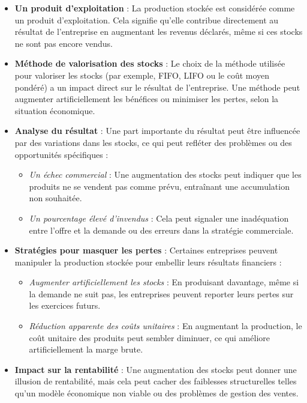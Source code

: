 \documentclass[a4paper, 12pt]{report}
\begin{document}
\begin{itemize}
	\item \textbf{Un produit d'exploitation} : La production stockée est considérée comme un produit d'exploitation. Cela signifie qu'elle contribue directement au résultat de l'entreprise en augmentant les revenus déclarés, même si ces stocks ne sont pas encore vendus.
	\item \textbf{Méthode de valorisation des stocks} : Le choix de la méthode utilisée pour valoriser les stocks (par exemple, FIFO, LIFO ou le coût moyen pondéré) a un impact direct sur le résultat de l'entreprise. Une méthode peut augmenter artificiellement les bénéfices ou minimiser les pertes, selon la situation économique.
	\item \textbf{Analyse du résultat} : Une part importante du résultat peut être influencée par des variations dans les stocks, ce qui peut refléter des problèmes ou des opportunités spécifiques :
	\begin{itemize}
		\item \textit{Un échec commercial} : Une augmentation des stocks peut indiquer que les produits ne se vendent pas comme prévu, entraînant une accumulation non souhaitée.
		\item \textit{Un pourcentage élevé d'invendus} : Cela peut signaler une inadéquation entre l'offre et la demande ou des erreurs dans la stratégie commerciale.
	\end{itemize}
	\item \textbf{Stratégies pour masquer les pertes} : Certaines entreprises peuvent manipuler la production stockée pour embellir leurs résultats financiers :
	\begin{itemize}
		\item \textit{Augmenter artificiellement les stocks} : En produisant davantage, même si la demande ne suit pas, les entreprises peuvent reporter leurs pertes sur les exercices futurs.
		\item \textit{Réduction apparente des coûts unitaires} : En augmentant la production, le coût unitaire des produits peut sembler diminuer, ce qui améliore artificiellement la marge brute.
	\end{itemize}
	\item \textbf{Impact sur la rentabilité} : Une augmentation des stocks peut donner une illusion de rentabilité, mais cela peut cacher des faiblesses structurelles telles qu'un modèle économique non viable ou des problèmes de gestion des ventes.
\end{itemize}
\end{document}
